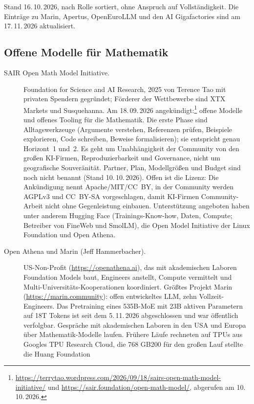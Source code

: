 \documentclass[a4paper,11pt]{article}
\begin{document}
Stand 16.\,10.\,2026, nach Rolle sortiert, ohne Anspruch auf
Vollständigkeit.  Die Einträge zu Marin, Apertus, OpenEuroLLM und den
AI Gigafactories sind am 17.\,11.\,2026 aktualisiert.

\subsection{Offene Modelle für Mathematik}

\begin{description}
\item[SAIR Open Math Model Initiative.]
  Foundation for Science and AI Research, 2025 von Terence Tao mit
  privaten Spendern gegründet; Förderer der Wettbewerbe sind XTX
  Markets und Susquehanna. Am 18.\,09.\,2026
  angekündigt:\footnote{\url{https://terrytao.wordpress.com/2026/09/18/sairs-open-math-model-initiative/}
  und \url{https://sair.foundation/open-math-model/}, abgerufen am
  10.\,10.\,2026.} offene Modelle und offenes Tooling für die
  Mathematik. Die erste Phase sind Alltagswerkzeuge (Argumente
  verstehen, Referenzen prüfen, Beispiele explorieren, Code schreiben,
  Beweise formalisieren); sie entspricht genau Horizont~1 und~2. Es
  geht um Unabhängigkeit der Community von den großen KI-Firmen,
  Reproduzierbarkeit und Governance, nicht um geografische
  Souveränität. Partner, Plan, Modellgrößen und Budget sind noch nicht
  benannt (Stand 10.\,10.\,2026). Offen ist die Lizenz: Die Ankündigung
  nennt Apache/MIT/CC~BY, in der Community werden AGPLv3 und CC~BY-SA
  vorgeschlagen, damit KI-Firmen Community-Arbeit nicht ohne
  Gegenleistung einbauen. Unterstützung angeboten haben unter anderem
  Hugging Face (Trainings-Know-how, Daten, Compute; Betreiber von
  FineWeb und SmolLM), die Open Model Initiative der Linux Foundation
  und Open Athena.
\item[Open Athena und Marin (Jeff Hammerbacher).]
  US-Non-Profit (\url{https://openathena.ai}), das mit akademischen
  Laboren Foundation Models baut, Engineers anstellt, Compute
  vermittelt und Multi-Universitäts-Kooperationen koordiniert. Größtes
  Projekt Marin (\url{https://marin.community}): offen entwickeltes
  LLM, zehn Vollzeit-Engineers.  Das Pretraining eines 535B-MoE mit
  23B aktiven Parametern auf 18T Tokens ist seit dem 5.\,11.\,2026
  abgeschlossen und war öffentlich verfolgbar.  Gespräche mit
  akademischen Laboren in den USA und Europa über Mathematik-Modelle
  laufen.  Frühere Läufe rechneten auf TPUs aus Googles TPU Research
  Cloud, die 768 GB200 für den großen Lauf stellte die Huang Foundation

\end{description}
\end{document}
